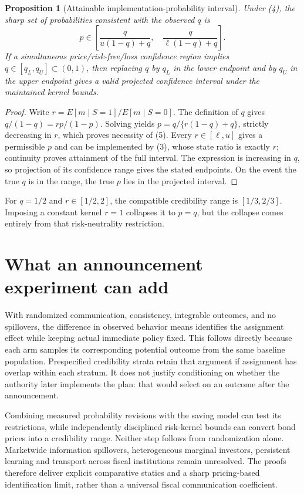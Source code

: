 \documentclass[11pt]{article}
\newtheorem{proposition}[theorem]{Proposition}
\theoremstyle{definition}
\begin{document}
\begin{proposition}[Attainable implementation-probability interval]
Under (4), the sharp set of probabilities consistent with the observed $q$ is
\[
 p\in\left[\frac{q}{u(1-q)+q},\quad
             \frac{q}{\ell(1-q)+q}\right].
 \tag{5}
\]
If a simultaneous price/risk-free/loss confidence region implies $q\in[q_L,q_U]\subset(0,1)$, then replacing $q$ by $q_L$ in the lower endpoint and by $q_U$ in the upper endpoint gives a valid projected confidence interval under the maintained kernel bounds.
\end{proposition}
\begin{proof}
Write $r=E[m\mid S=1]/E[m\mid S=0]$. The definition of $q$ gives
$q/(1-q)=r p/(1-p)$. Solving yields $p=q/\{r(1-q)+q\}$, strictly decreasing in $r$, which proves necessity of (5). Every $r\in[\ell,u]$ gives a permissible $p$ and can be implemented by (3), whose state ratio is exactly $r$; continuity proves attainment of the full interval. The expression is increasing in $q$, so projection of its confidence range gives the stated endpoints. On the event the true $q$ is in the range, the true $p$ lies in the projected interval.
\end{proof}
For $q=1/2$ and $r\in[1/2,2]$, the compatible credibility range is $[1/3,2/3]$. Imposing a constant kernel $r=1$ collapses it to $p=q$, but the collapse comes entirely from that risk-neutrality restriction.

\section*{What an announcement experiment can add}
With randomized communication, consistency, integrable outcomes, and no spillovers, the difference in observed behavior means identifies the assignment effect while keeping actual immediate policy fixed. This follows directly because each arm samples its corresponding potential outcome from the same baseline population. Prespecified credibility strata retain that argument if assignment has overlap within each stratum. It does not justify conditioning on whether the authority later implements the plan: that would select on an outcome after the announcement.

Combining measured probability revisions with the saving model can test its restrictions, while independently disciplined risk-kernel bounds can convert bond prices into a credibility range. Neither step follows from randomization alone. Marketwide information spillovers, heterogeneous marginal investors, persistent learning and transport across fiscal institutions remain unresolved. The proofs therefore deliver explicit comparative statics and a sharp pricing-based identification limit, rather than a universal fiscal communication coefficient.
\end{document}

